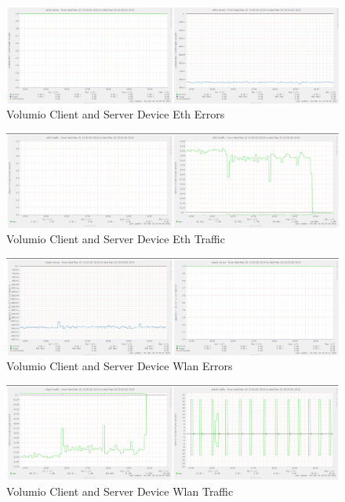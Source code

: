 \documentclass[11pt,a4paper]{scrreprt}
\begin{document}
\begin{figure}[H]
\includegraphics{ResultsAndAnalysis/VolumioServerTestImages/010VolumioEth0Errors.png}
\centering
\caption{Volumio Client and Server Device Eth Errors}
\label{VolumioEthError}
\end{figure}

\begin{figure}[H]
\includegraphics{ResultsAndAnalysis/VolumioServerTestImages/011VolumioEth0Traffic.png}
\centering
\caption{Volumio Client and Server Device Eth Traffic}
\label{VolumioEthTraffic}
\end{figure}

\begin{figure}[H]
\includegraphics{ResultsAndAnalysis/VolumioServerTestImages/022VolumioWlan0Errors.png}
\centering
\caption{Volumio Client and Server Device Wlan Errors}
\label{VolumioWlanError}
\end{figure}

\begin{figure}[H]
\includegraphics{ResultsAndAnalysis/VolumioServerTestImages/023VolumioWlan0Traffic.png}
\centering
\caption{Volumio Client and Server Device Wlan Traffic}
\label{VolumioWlanTraffic}
\end{figure}
\end{document}
